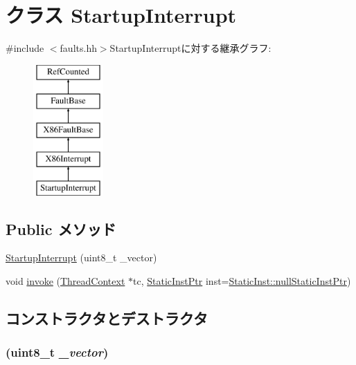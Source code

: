 \hypertarget{classX86ISA_1_1StartupInterrupt}{
\section{クラス StartupInterrupt}
\label{classX86ISA_1_1StartupInterrupt}
}


{\ttfamily \#include $<$faults.hh$>$}StartupInterruptに対する継承グラフ:\begin{figure}[H]
\begin{center}
\leavevmode
\includegraphics[height=5cm]{classX86ISA_1_1StartupInterrupt}
\end{center}
\end{figure}
\subsection*{Public メソッド}
\begin{DoxyCompactItemize}
\item 
\hyperlink{classX86ISA_1_1StartupInterrupt_a2fb69b1ab5482bd57f427ee5e1d435b1}{StartupInterrupt} (uint8\_\-t \_\-vector)
\item 
void \hyperlink{classX86ISA_1_1StartupInterrupt_a2bd783b42262278d41157d428e1f8d6f}{invoke} (\hyperlink{classThreadContext}{ThreadContext} $\ast$tc, \hyperlink{classRefCountingPtr}{StaticInstPtr} inst=\hyperlink{classStaticInst_aa793d9793af735f09096369fb17567b6}{StaticInst::nullStaticInstPtr})
\end{DoxyCompactItemize}


\subsection{コンストラクタとデストラクタ}
\hypertarget{classX86ISA_1_1StartupInterrupt_a2fb69b1ab5482bd57f427ee5e1d435b1}{
\subsubsection[{StartupInterrupt}]{ (uint8\_\-t {\em \_\-vector})}}
\label{classX86ISA_1_1StartupInterrupt_a2fb69b1ab5482bd57f427ee5e1d435b1}



